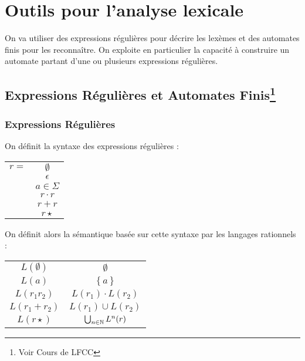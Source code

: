 \documentclass{cours}
\begin{document}
\section{Outils pour l'analyse lexicale}
On va utiliser des expressions régulières pour décrire les lexèmes et des automates finis pour les reconnaître. On exploite en particulier la capacité à construire un automate partant d'une ou plusieurs expressions régulières.

\subsection[Expressions Régulières et Automates Finis]{Expressions Régulières et Automates Finis\footnote{Voir Cours de LFCC}}

\subsubsection{Expressions Régulières}
\begin{definition}[Syntaxe]
    On définit la syntaxe des expressions régulières :
    \begin{center}
        \begin{tabular}{c@{$\mid$}c}
            $r = $ & $\emptyset$    \\
                   & $\epsilon$     \\
                   & $a \in \Sigma$ \\
                   & $r \cdot r$    \\
                   & $r + r$        \\
                   & $r\star$       \\
        \end{tabular}
    \end{center}
\end{definition}

\begin{definition}[Sémantique]
    On définit alors la sémantique basée sur cette syntaxe par les langages rationnels :
    \begin{center}
        \begin{tabular}{c@{ = }c}
            $L(\emptyset)$     & $\emptyset$                   \\
            $L(a)$             & $\left\{a\right\}$            \\
            $L(r_{1}r_{2})$    & $L(r_{1}) \cdot L(r_{2})$     \\
            $L(r_{1} + r_{2})$ & $L(r_{1}) \cup L(r_{2})$      \\
            $L(r\star)$        & $\bigcup_{n \in \mathbb{N}} L^{n}(r)$
        \end{tabular}
    \end{center}
\end{definition}
\end{document}
